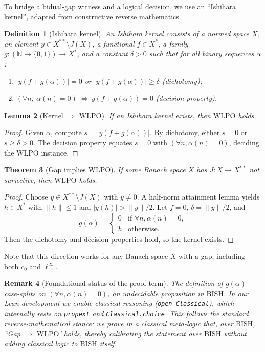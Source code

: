 \documentclass[11pt]{article}  %
\newtheorem{theorem}{Theorem}[section]
\newtheorem{lemma}[theorem]{Lemma}
\newtheorem{definition}[theorem]{Definition}
\newtheorem{remark}[theorem]{Remark}
\newenvironment{thm}{\begin{theorem}}{\end{theorem}}
\newenvironment{lem}{\begin{lemma}}{\end{lemma}}
\newenvironment{defi}{\begin{definition}}{\end{definition}}
\newenvironment{rem}{\begin{remark}}{\end{remark}}
\newtheorem{theorem}{Theorem}[section]
\newtheorem{lemma}[theorem]{Lemma}
\newtheorem{definition}[theorem]{Definition}
\newtheorem{remark}[theorem]{Remark}
\newenvironment{thm}{\begin{theorem}}{\end{theorem}}
\newenvironment{lem}{\begin{lemma}}{\end{lemma}}
\newenvironment{defi}{\begin{definition}}{\end{definition}}
\newenvironment{rem}{\begin{remark}}{\end{remark}}
\newcommand{\N}{\mathbb{N}}
\newcommand{\WLPO}{\mathrm{WLPO}}
\newcommand{\BISH}{\mathrm{BISH}}
\begin{document}
To bridge a bidual-gap witness and a logical decision, we use an ``Ishihara kernel'', adapted from constructive reverse mathematics.

\begin{defi}[Ishihara kernel]
An Ishihara kernel consists of a normed space $X$, an element $y\in X^{**}\setminus J(X)$, a functional $f\in X^*$, a family $g:(\N\to\{0,1\})\to X^*$, and a constant $\delta>0$ such that for all binary sequences $\alpha$:
\begin{enumerate}
\item $|y(f+g(\alpha))|=0$ or $|y(f+g(\alpha))|\ge \delta$ (dichotomy);
\item $(\forall n,\ \alpha(n)=0)\ \Leftrightarrow\ y(f+g(\alpha))=0$ (decision property).
\end{enumerate}
\end{defi}

\begin{lem}[Kernel $\Rightarrow$ $\WLPO$]
If an Ishihara kernel exists, then $\WLPO$ holds.
\end{lem}

\begin{proof}
Given $\alpha$, compute $s=|y(f+g(\alpha))|$. By dichotomy, either $s=0$ or $s\ge \delta>0$. The decision property equates $s=0$ with $(\forall n,\alpha(n)=0)$, deciding the $\WLPO$ instance.
\end{proof}

\begin{thm}[Gap implies $\WLPO$]\label{thm:gap-implies-wlpo}
If some Banach space $X$ has $J:X\to X^{**}$ not surjective, then $\WLPO$ holds.
\end{thm}

\begin{proof}
Choose $y\in X^{**}\setminus J(X)$ with $y\ne 0$. A half-norm attainment lemma yields $h\in X^*$ with $\|h\|\le 1$ and $|y(h)|>\|y\|/2$. Let $f=0$, $\delta=\|y\|/2$, and
\[
g(\alpha)=\begin{cases}
0 & \text{if } \forall n,\alpha(n)=0,\\
h & \text{otherwise}.
\end{cases}
\]
Then the dichotomy and decision properties hold, so the kernel exists.
\end{proof}

Note that this direction works for any Banach space $X$ with a gap, including both $c_0$ and $\ell^\infty$.

\begin{rem}[Foundational status of the proof term]\label{rem:meta-classical}
The definition of $g(\alpha)$ case-splits on $(\forall n,\alpha(n)=0)$, an undecidable proposition in $\BISH$. In our Lean development we enable classical reasoning (\texttt{open Classical}), which internally rests on \texttt{propext} and \texttt{Classical.choice}. This follows the standard reverse-mathematical stance: we prove in a classical meta-logic that, over $\BISH$, ``Gap $\Rightarrow$ $\WLPO$' holds, thereby calibrating the statement over $\BISH$ without adding classical logic to $\BISH$ itself.
\end{rem}
\end{document}
